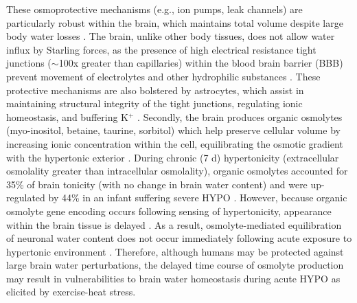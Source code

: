 These osmoprotective mechanisms (e.g., ion pumps, leak channels) are particularly robust within the brain, which maintains total volume despite large body water losses \cite{nose_distribution_1983,cipolla_cerebral_2009,cserr_extracellular_1991}. The brain, unlike other body tissues, does not allow water influx by Starling forces, as the presence of high electrical resistance tight junctions (${\sim}$100x greater than capillaries) within the blood brain barrier (BBB) prevent movement of electrolytes and other hydrophilic substances \cite{kimelberg_water_2004,cipolla_cerebral_2009,ropper_hyperosmolar_2012,bain_cerebral_2015}. These protective mechanisms are also bolstered by astrocytes, which assist in maintaining structural integrity of the tight junctions, regulating ionic homeostasis, and buffering K${^+}$ \cite{cipolla_cerebral_2009}. Secondly, the brain produces organic osmolytes (myo-inositol, betaine, taurine, sorbitol) which help preserve cellular volume by increasing ionic concentration within the cell, equilibrating the osmotic gradient with the hypertonic exterior \cite{de_petris_cell_2001,weed_pressure_1919}. During chronic (7 d) hypertonicity (extracellular osmolality greater than intracellular osmolality), organic osmolytes accounted for 35\% of brain tonicity (with no change in brain water content) \cite{lien_effects_1990} and were up-regulated by 44\% in an infant suffering severe HYPO \cite{lee_organic_1994}. However, because organic osmolyte gene encoding occurs following sensing of hypertonicity, appearance within the brain tissue is delayed \cite{de_petris_cell_2001, gullans_control_1993}. As a result, osmolyte-mediated equilibration of neuronal water content does not occur immediately following acute exposure to hypertonic environment \cite{ayus_effects_1996}. Therefore, although humans may be protected against large brain water perturbations, the delayed time course of osmolyte production may result in vulnerabilities to brain water homeostasis during acute HYPO as elicited by exercise-heat stress. 


